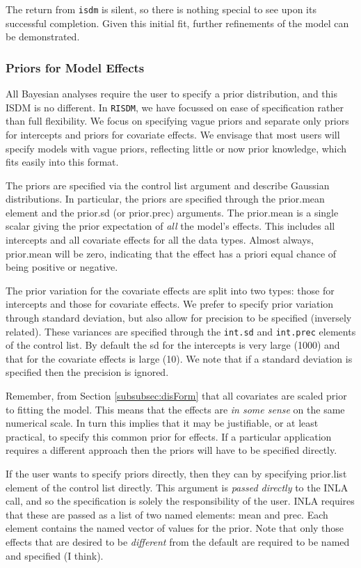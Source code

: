 \documentclass[article,shortnames,nojss]{jss}\usepackage[]{graphicx}\usepackage[]{xcolor}
\begin{document}
The return from \texttt{isdm} is silent, so there is nothing special to see upon its successful completion. Given this initial fit, further refinements of the model can be demonstrated.
  
\subsubsection*{Priors for Model Effects} \label{subsubsec:priors}
  
All Bayesian analyses require the user to specify a prior distribution, and this ISDM is no different. In \texttt{RISDM}, we have focussed on ease of specification rather than full flexibility. We focus on specifying vague priors and separate only priors for intercepts and priors for covariate effects. We envisage that most users will specify models with vague priors, reflecting little or now prior knowledge, which fits easily into this format.
  
The priors are specified via the control list argument and describe Gaussian distributions. In particular, the priors are specified through the prior.mean element and the prior.sd (or prior.prec) arguments. The prior.mean is a single scalar giving the prior expectation of \textit{all} the model's effects. This includes all intercepts and all covariate effects for all the data types. Almost always, prior.mean will be zero, indicating that the effect has a priori equal chance of being positive or negative.

The prior variation for the covariate effects are split into two types: those for intercepts and those for covariate effects. We prefer to specify prior variation through standard deviation, but also allow for precision to be specified (inversely related). These variances are specified through the \texttt{int.sd} and \texttt{int.prec} elements of the control list. By default the sd for the intercepts is very large (1000) and that for the covariate effects is large (10). We note that if a standard deviation is specified then the precision is ignored.

Remember, from Section \ref{subsubsec:disForm} that all covariates are scaled prior to fitting the model. This means that the effects are \textit{in some sense} on the same numerical scale. In turn this implies that it may be justifiable, or at least practical, to specify this common prior for effects. If a particular application requires a different approach then the priors will have to be specified directly.

If the user wants to specify priors directly, then they can by specifying prior.list element of the control list directly. This argument is \textit{passed directly} to the INLA call, and so the specification is solely the responsibility of the user. INLA requires that these are passed as a list of two named elements: mean and prec. Each element contains the named vector of values for the prior. Note that only those effects that are desired to be \textit{different} from the default are required to be named and specified (I think).
\end{document}
